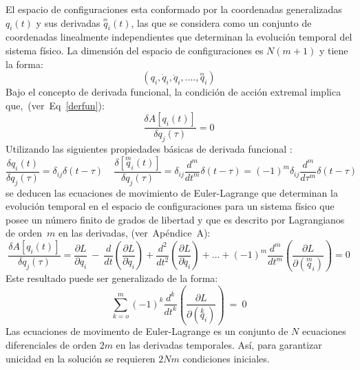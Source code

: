 \documentclass[a4paper,12pt]{article}
\begin{document}
El espacio de configuraciones esta conformado por la coordenadas \mbox{generalizadas $q_i(t)$} y sus derivadas $\overset{_{m}}{q}_i(t)$, las que se considera como un conjunto de coordenadas linealmente independientes que determinan la evolución temporal del sistema físico. La dimensión del espacio de configuraciones es $N(m+1)$ y tiene la forma:
\begin{equation}
(q_i,\dot q_i,\ddot q_i,....,\overset{_{m}}{q}_i) 
\end{equation}
Bajo el concepto de derivada funcional, la condición de acción extremal implica \mbox{que, (ver Eq \eqref{derfun}):}
\begin{equation}
\frac{\delta A[q_i(t)]}{\delta q_j(\tau)}=0 
\end{equation}
Utilizando las siguientes propiedades básicas de derivada funcional \cite{funcional}: 
\begin{equation}
\frac{\delta q_i(t)}{\delta q_j(\tau)}=\delta_{ij} \delta(t-\tau)\ \ \ \ \ \frac{\delta [\overset{m}{q}_i(t)]}{\delta {q}_j(\tau)}=\delta_{ij} \frac{d^m}{dt^m}\delta(t-\tau)=(-1)^m\delta_{ij} \frac{d^m}{d\tau^m}\delta(t-\tau) 
\label{propfun}
\end{equation}
se deducen las ecuaciones de movimiento de \mbox{Euler-Lagrange} que determinan la evolución temporal en el espacio de configuraciones para un sistema físico que posee un número finito de grados de libertad y que es descrito por Lagrangianos de \mbox{orden $m$} en las derivadas, (\mbox{ver Apéndice A):} 
\begin{equation}
\frac{\delta A[q_i(t)]}{\delta q_j(\tau)}=\frac{\partial L}{\partial q_i} \ -\  \frac{d}{dt}\left(\frac{\partial L}{\partial \dot q_i}\right)+\frac{d^2}{dt^2}\left(\frac{\partial L}{\partial \ddot q_i}\right)+\dotso+(-1)^m\frac{d^m}{dt^m}\left(\frac{\partial L}{\partial (\overset{m}{q}_i)}\right)=0  
\end{equation}
Este resultado puede ser generalizado de la forma:
\begin{equation}
\sum\limits_{k=o}^m(-1)^k\frac{d^k}{dt^k}\left(\frac{\partial L}{\partial(\overset{k}{q}_i )} \right)\ =\ 0 
\end{equation}
Las ecuaciones de movimento de Euler-Lagrange es un conjunto de $N$ ecuaciones diferenciales de orden $2m$ en las derivadas temporales. Así, para garantizar unicidad en la solución se requieren $2Nm$ condiciones iniciales.
\end{document}
